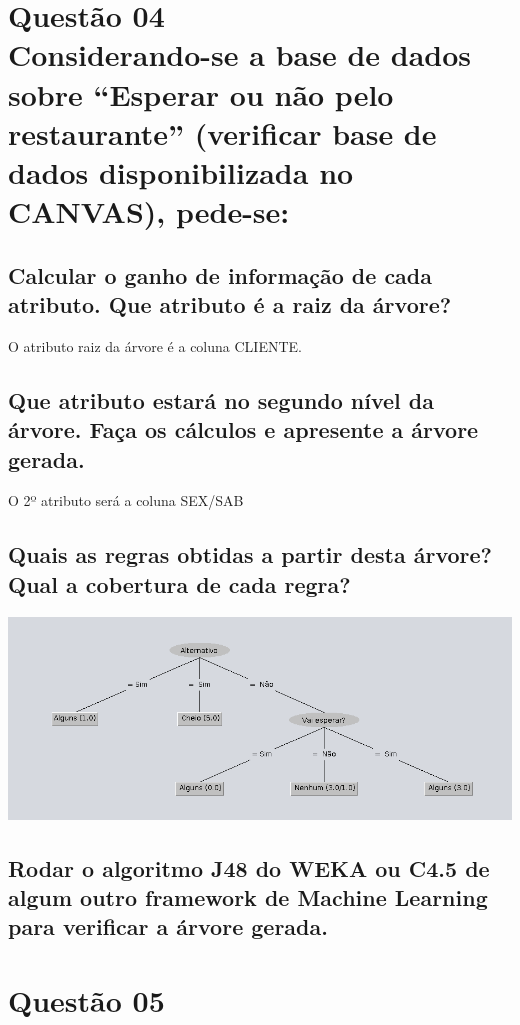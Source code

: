 \documentclass[12pt]{article}
\begin{document}
\section{Questão 04\\
Considerando-se a base de dados sobre “Esperar ou não pelo restaurante” (verificar
base de dados disponibilizada no CANVAS), pede-se:
}
\subsection{Calcular o ganho de informação de cada atributo. Que atributo é a raiz da
árvore?
}
O atributo raiz da árvore é a coluna CLIENTE.
\subsection{Que atributo estará no segundo nível da árvore. Faça os cálculos e apresente a
árvore gerada.
}
O 2º atributo será a coluna SEX/SAB
\subsection{Quais as regras obtidas a partir desta árvore? Qual a cobertura de cada regra?
}


    \includegraphics[width=\linewidth]{./ibagens/arvore.png}


\subsection{Rodar o algoritmo J48 do WEKA ou C4.5 de algum outro framework de
Machine Learning para verificar a árvore gerada.
}

\section{Questão 05}
\end{document}
